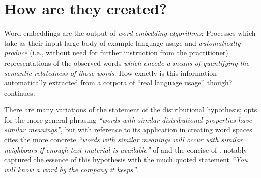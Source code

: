 \documentclass{ucetd}
\begin{document}
\section{How are they created?}
Word embeddings are the output of \emph{word embedding algorithms}: Processes which take as their input large body of example language-usage and \emph{automatically produce} (i.e., without need for further instruction from the practitioner) representations of the observed words \emph{which encode a means of quantifying the semantic-relatedness of those words}.
How exactly is this information automatically extracted from a corpora of ``real language usage'' though? \citeauthor{sahlgreen-2006-the-word-space-model} continues:
\begin{definition}
There are many variations of the statement of the distributional hypothesis; \citeauthor{sahlgreen-2006-the-word-space-model} opts for the more general phrasing \emph{``words with similar distributional properties have similar meanings''}, but with reference to its application in creating word spaces cites the more concrete \emph{``words with similar meanings will occur with similar neighbours if enough text material is available''} of \textcite{schutze-1995-information-retrieval} and the concise  of \textcite{rubenstein-1965-contextual-correlates}. \textcite{firth-1957-a-syn-of-lin} notably captured the essence of this hypothesis with the much quoted statement \emph{``You will know a word by the company it keeps''}.
\end{definition}\label{def:distrib-hyp}
\end{document}
